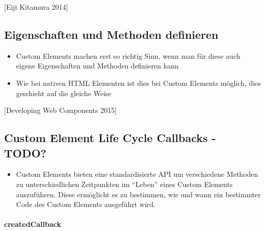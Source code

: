 {[}Eiji Kitamura 2014{]}

\subsection{Eigenschaften und Methoden
definieren}\label{eigenschaften-und-methoden-definieren}

\begin{itemize}
\tightlist
\item
  Custom Elements machen erst so richtig Sinn, wenn man für diese auch
  eigene Eigenschaften und Methoden definieren kann
\item
  Wie bei nativen HTML Elementen ist dies bei Custom Elements möglich,
  dies geschieht auf die gleiche Weise
\end{itemize}

\begin{Shaded}
\begin{Highlighting}[]
 \OperatorTok{=}  \NormalTok{() }\OperatorTok{\{}
  \NormalTok{(}\NormalTok{)}\OperatorTok{;}
\OperatorTok{\};}

 \OperatorTok{=} \OperatorTok{;}
\end{Highlighting}
\end{Shaded}

{[}Developing Web Components 2015{]}

\subsection{Custom Element Life Cycle Callbacks -
TODO?}\label{custom-element-life-cycle-callbacks---todo}

\begin{itemize}
\tightlist
\item
  Custom Elements bieten eine standardisierte API um verschiedene
  Methoden zu unterschiedlichen Zeitpunkten im ``Leben'' eines Custom
  Elements auszuführen. Diese ermöglicht es zu bestimmen, wie und wann
  ein bestimmter Code des Custom Elements ausgeführt wird.
\end{itemize}

\paragraph{createdCallback}\label{createdcallback}

